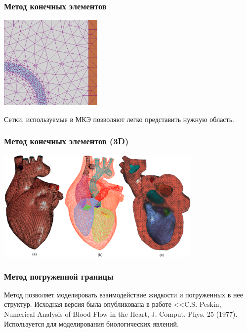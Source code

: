 \documentclass[14pt, notes]{beamer}
\begin{document}
\begin{frame}
\frametitle{Метод конечных элементов}
    \begin{center}
        \includegraphics[width=5cm]{immersed_boundary/Example_of_2D_mesh.png}
    \end{center}
    Сетки, используемые в МКЭ позволяют легко представить нужную область.
\end{frame}

\begin{frame}
    \frametitle{Метод конечных элементов (3D)}
    \begin{center}
        \includegraphics[width=10cm]{immersed_boundary/heart_bound.png}
    \end{center}
\end{frame}

\begin{frame}
\frametitle{Метод погруженной границы}
Метод позволяет моделировать взаимодействие жидкости и погруженных в нее структур. Исходная версия была опубликована в работе <<C.S. Peskin, Numerical Analysis of Blood Flow in the Heart, J. Comput. Phys. 25 (1977). Используется для моделирования биологических явлений.
\end{frame}
\end{document}
